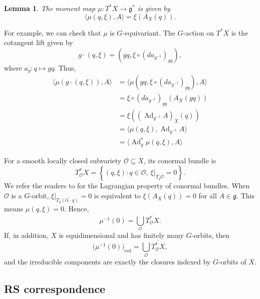 \documentclass[12pt,a4paper]{article}
\theoremstyle{plain}
\newtheorem{lemma}[thm]{Lemma}
\theoremstyle{definition}
\theoremstyle{remark}
\newcommand{\cO}{\mathcal{O}}
\def\gfrak{\mathfrak{g}}
\begin{document}
    \begin{lemma}\label{lem:mu}
        The moment map $\mu:T^*X \rightarrow \gfrak^*$ is given by
        \[
        \langle\mu(q,\xi),A\rangle=\xi(A_X(q)).
        \]
    \end{lemma}

    For example, we can check that $\mu$ is $G$-equivariant. The $G$-action on $T^*X$ is the cotangent lift given by
    \[
    g\cdot (q,\xi) = \left(g q,  \xi \circ (da_{g^{-1}})_{gq} \right),
    \]
    where $a_g:q\mapsto gq$. Thus,
    \begin{align*}
        \langle \mu(g\cdot(q,\xi)), A \rangle &= \langle \mu(g q,  \xi \circ (da_{g^{-1}})_{gq}), A \rangle \\
        &= \xi \circ (da_{g^{-1}})_{gq}(A_X(gq)) \\
        &= \xi ((\operatorname{Ad}_{g^{-1}}A)_X(q))\\
        &= \langle \mu(q,\xi), \operatorname{Ad}_{g^{-1}}A \rangle \\
        &= \langle \operatorname{Ad}^*_{g}\mu(q,\xi), A \rangle
    \end{align*}

    For a smooth locally closed subvariety $\mathcal O\subseteq X$, its conormal bundle is
    \[
    T^*_{\cO}X
    = \left\{(q,\xi):q\in\mathcal O,\ \xi|_{T_q\mathcal O}=0\right\}.
    \]
    We refer the readers to \cite[Section~3.3]{da2004lectures} for the Lagrangian property of conormal bundles. When $\cO$ is a $G$-orbit, $\xi|_{T_q(G\cdot q)}=0$ is equivalent to $\xi(A_X(q))=0$ for all $A\in \gfrak$. This means $\mu(q,\xi) = 0$. Hence,
    \[
    \mu^{-1}(0) = \bigcup_{\cO}\overline{T^*_{\cO}X}.
    \]
    If, in addition, $X$ is equidimensional and has finitely many $G$-orbits, then
    \[
    \bigl(\mu^{-1}(0)\bigr)_{\mathrm{red}}
    =\bigcup_{\mathcal O}\overline{T^*_{\mathcal O}X},
    \]
    and the irreducible components are exactly the closures indexed by $G$-orbits of $X$.

\subsection{RS correspondence}
\end{document}
